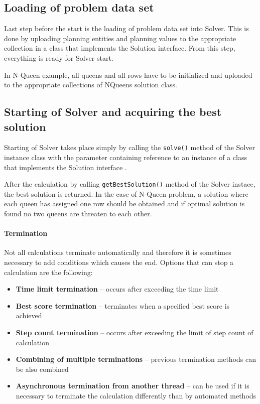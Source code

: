 \subsection{Loading of problem data set}
Last step before the start is the loading of problem data set into Solver. This is done by uploading planning entities and planning values to the appropriate collection in a class that implements the Solution interface. From this step, everything is ready for Solver start.

In N-Queen example, all queens and all rows have to be initialized and uploaded to the appropriate collections of NQueens solution class.

\subsection{Starting of Solver and acquiring the best solution}
Starting of Solver takes place simply by calling the \texttt{solve()} method of the Solver instance class with the parameter containing reference to an instance of a class that implements the Solution interface .

After the calculation by calling \texttt{getBestSolution()} method of the Solver instace, the best solution is returned. In the case of N-Queen problem, a solution where each queen has assigned one row should be obtained and if optimal solution is found no two queens are threaten to each other.

\paragraph{Termination}
Not all calculations terminate automatically and therefore it is sometimes necessary to add conditions which causes the end. Options that can stop a calculation are the following:

\begin{itemize}
\item \textbf{Time limit termination} -- occurs after exceeding the time limit
\item \textbf{Best score termination} -- terminates when a specified best score is achieved
\item \textbf{Step count termination} -- occurs after exceeding the limit of step count of calculation
\item \textbf{Combining of multiple terminations} -- previous termination methods can be also combined
\item \textbf{Asynchronous termination from another thread} -- can be used if it is necessary to terminate the calculation differently than by automated methods
\end{itemize}
